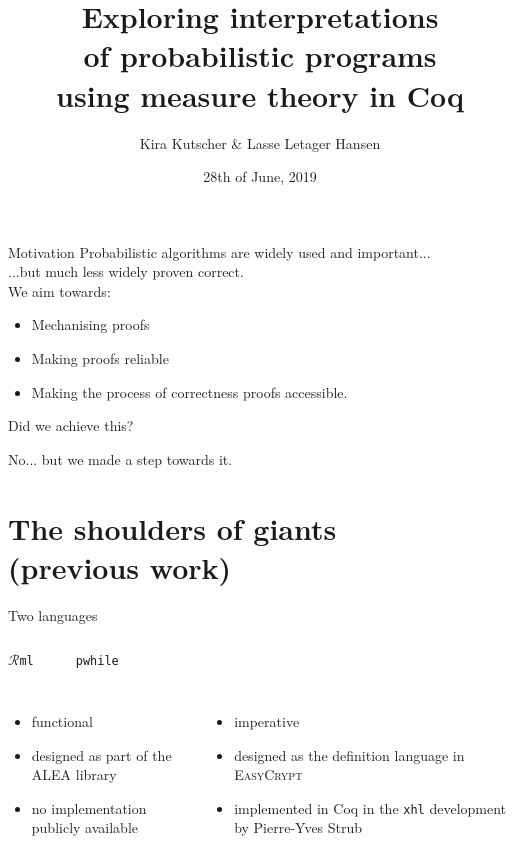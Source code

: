 \documentclass{beamer}
\title{Exploring interpretations \\ of probabilistic programs \\ using measure theory in Coq}
\author{Kira Kutscher \& Lasse Letager Hansen}
\date{28th of June, 2019}
\begin{document}
\newcommand\rml{$\mathcal{R}$\texttt{ml}} %
\maketitle


\begin{frame}{Motivation}
  Probabilistic algorithms are widely used and important...\\
    \pause
    ...but much less widely proven correct.\\
    \bigskip
    \pause
    We aim towards:
    \pause
    \begin{itemize}
        \item Mechanising proofs
      \pause
        \item Making proofs reliable
      \pause
        \item Making the process of correctness proofs accessible. 
    \end{itemize}
    \pause
    \bigskip
    \medskip
    Did we achieve this?
    \pause
    \begin{flushright}
      No... but we made a step towards it. 
    \end{flushright}
\end{frame}


\section{The shoulders of giants \\ (previous work)}


\begin{frame}{Two languages}
  \begin{columns}
    \LARGE{\rml}\tiny{\cite{rml-paper}}
    \hrule
    \LARGE{\texttt{pwhile}}\tiny{\cite{easy-crypt}}
    \vspace{-0.5em}
    \hrule
  \end{columns}
  \pause
  \begin{columns}
    \begin{itemize}
        \item functional
        \item designed as part of the ALEA library
        \item no implementation publicly available
    \end{itemize}
    \pause
    \begin{itemize}
        \item imperative
        \item designed as the definition language in \textsc{EasyCrypt}
        \item implemented in Coq in the \texttt{xhl} development by Pierre-Yves
      Strub
    \end{itemize}
  \end{columns}
\end{frame}
\end{document}
